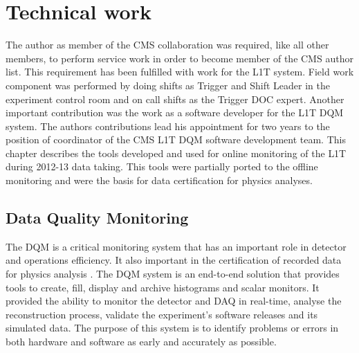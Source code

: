 \chapter{Technical work}
\label{CHAPTER:TechnicalWork}

\glsresetall %


The author as member of the \gls{CMS} collaboration was required, like all other members, to perform service work in order to become member of the \gls{CMS} author list. This requirement has been fulfilled with work for the \gls{L1T} system. Field work component was performed by doing shifts as Trigger and Shift Leader in the experiment control room and on call shifts as the Trigger \gls{DOC} expert. Another important contribution was the work as a software developer for the \gls{L1T} \gls{DQM} system. The authors contributions lead his appointment for two years to the position of coordinator of the \gls{CMS} \gls{L1T} \gls{DQM} software development team. This chapter describes the tools developed and used for online monitoring of the \gls{L1T} during 2012-13 data taking. This tools were partially ported to the offline monitoring and were the basis for data certification for physics analyses.

\section{Data Quality Monitoring}
\label{SECTION:TechnicalWork_DataQualityMonitoring}


The \acrfull{DQM} is a critical monitoring system that has an important role in detector and operations efficiency. It also important in the certification of recorded data for physics analysis \cite{CMSTDR:CMSTridasTDRVol1,ARTICLE:CMSDataQualityMonitoringSoftWare_ExperienceAndFuture}. The \gls{DQM} system is an end-to-end solution that provides tools to create, fill, display and archive histograms and scalar monitors. It provided the ability to monitor the detector and \gls{DAQ} in real-time, analyse the reconstruction process, validate the experiment's software releases and its simulated data. The purpose of this system is to identify problems or errors in both hardware and software as early and accurately as possible.

